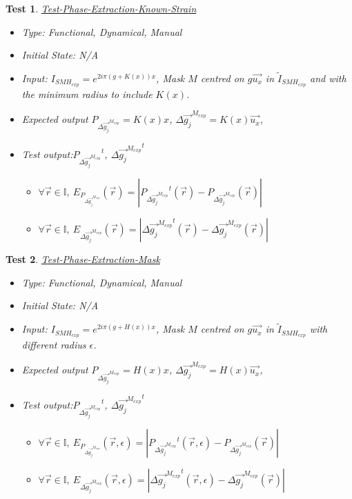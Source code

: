 \documentclass[12pt, titlepage]{article}
\newtheorem{Test}{Test}
\begin{document}
\begin{Test}\normalfont\underline{Test-Phase-Extraction-Known-Strain}
\label{T_Phase-Extraction-Known-Strain}
\begin{itemize}
\item Type: Functional, Dynamical, Manual
\item Initial State: N/A
\item Input: $I_{SMH_{exp}}=e^{2i\pi (g+K(x))x}$, Mask $M$ centred on $g\overrightarrow{u_x}$ in $\widetilde{I}_{SMH_{exp}}$ and with the minimum radius to include $K(x)$. 
\item Expected output $P_{\Delta \overrightarrow{g_{j}}^{M_{exp}}}=K(x)x$, $\Delta \overrightarrow{g_{j}}^{M_{exp}}=K(x)\overrightarrow{u_x}$, 
\item Test output:${P_{\Delta \overrightarrow{g_{j}}^{M_{exp}}}}^{t}$, $\Delta {\overrightarrow{g_{j}}^{M_{exp}}}^{t}$
	\begin{itemize}
	\item $\forall \vec{r} \in \mathbb{I}, \ E_{P_{\Delta \overrightarrow{g_{j}}^{M_{exp}}}}(\vec{r})=|{P_{\Delta \overrightarrow{g_{j}}^{M_{exp}}}}^{t}(\vec{r})-P_{\Delta \overrightarrow{g_{j}}^{M_{exp}}}(\vec{r})|$
	\item $\forall \vec{r} \in \mathbb{I}, \ E_{\Delta {\overrightarrow{g_{j}}^{M_{exp}}}}(\vec{r})=|{\Delta {\overrightarrow{g_{j}}^{M_{exp}}}}^t(\vec{r})-{\Delta {\overrightarrow{g_{j}}^{M_{exp}}}}(\vec{r})|$
	\end{itemize}  
\end{itemize}
\end{Test}				
 
\begin{Test}\normalfont\underline{Test-Phase-Extraction-Mask}
\label{T_Phase-Extraction-Mask}
\begin{itemize}
\item Type: Functional, Dynamical, Manual
\item Initial State: N/A
\item Input: $I_{SMH_{exp}}=e^{2i\pi (g+H(x))x}$, Mask $M$ centred on $g\overrightarrow{u_x}$ in $\widetilde{I}_{SMH_{exp}}$ with different radius $\epsilon$. 
\item Expected output $P_{\Delta \overrightarrow{g_{j}}^{M_{exp}}}=H(x)x$, $\Delta \overrightarrow{g_{j}}^{M_{exp}}=H(x)\overrightarrow{u_x}$, 
\item Test output:${P_{\Delta \overrightarrow{g_{j}}^{M_{exp}}}}^{t}$, $\Delta {\overrightarrow{g_{j}}^{M_{exp}}}^{t}$
	\begin{itemize}
	\item $\forall \vec{r} \in \mathbb{I}, \ E_{P_{\Delta \overrightarrow{g_{j}}^{M_{exp}}}}(\vec{r},\epsilon)=|{P_{\Delta \overrightarrow{g_{j}}^{M_{exp}}}}^{t}(\vec{r},\epsilon)-P_{\Delta \overrightarrow{g_{j}}^{M_{exp}}}(\vec{r})|$
	\item $\forall \vec{r} \in \mathbb{I}, \ E_{\Delta {\overrightarrow{g_{j}}^{M_{exp}}}}(\vec{r},\epsilon)=|{\Delta {\overrightarrow{g_{j}}^{M_{exp}}}}^t(\vec{r},\epsilon)-{\Delta {\overrightarrow{g_{j}}^{M_{exp}}}}(\vec{r})|$
	\end{itemize}
\end{itemize}
\end{Test}						
\end{document}
